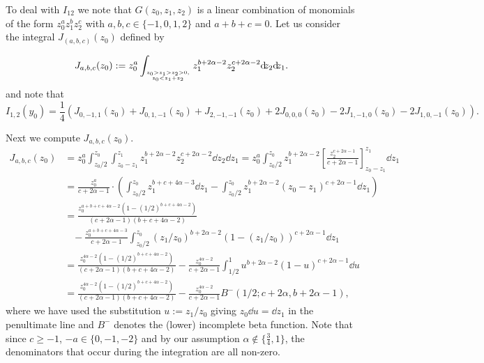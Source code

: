 To deal with $I_{12}$ we note that $G(z_0,z_1,z_2)$ is a linear combination of monomials of the form $z_0^az_1^bz_2^c$ with 
$a,b,c \in \{-1,0,1,2\}$ and $a+b+c=0$. Let us consider the integral $J_{(a,b,c)}(z_0)$ defined by 

\begin{equation}\label{eq:def_Delta_P_computation_int_J_1}
	J_{a,b,c}(z_0) := z_0^a \int_{{z_0>z_1>z_2>0,}\atop{z_0 < z_1+z_2}} z_1^{b+2\alpha-2} z_2^{c+2\alpha-2} {\operatorname{\mathrm{d}\hspace{-2pt}}}z_2{\operatorname{\mathrm{d}\hspace{-2pt}}}z_1.
\end{equation}
and note that
\begin{equation}\label{eq:Delta_P_computation_I12_with_J}
	I_{1,2}(y_0) = \frac{1}{4} (J_{0,-1,1}(z_0)+J_{0,1,-1}(z_0)+J_{2,-1,-1}(z_0)+2J_{0,0,0}(z_0)-2J_{1,-1,0}(z_0)-2J_{1,0,-1}(z_0)).
\end{equation}

Next we compute $J_{a,b,c}(z_0)$.
\begin{align*}
	J_{a,b,c}(z_0) 
	&= z_0^a \int_{z_0/2}^{z_0}\int_{z_0-z_1}^{z_1} z_1^{b+2\alpha-2} z_2^{c+2\alpha-2} {\dd}z_2{\dd}z_1
		= z_0^a \int_{z_0/2}^{z_0} z_1^{b+2\alpha-2} \left[ \frac{ z_2^{c+2\alpha-1} }{ c+2\alpha-1 } \right]_{z_0-z_1}^{z_1} \dd z_1\\
	&= \frac{z_0^a}{c+2\alpha-1} \cdot \left( \int_{z_0/2}^{z_0} z_1^{b+c+4\alpha-3} \dd z_1
	   - \int_{z_0/2}^{z_0} z_1^{b+2\alpha-2} (z_0-z_1)^{c+2\alpha-1} {\dd}z_1 \right) \\
	&= \frac{z_0^{a+b+c+4\alpha-2}(1-(1/2)^{b+c+4\alpha-2})}{(c+2\alpha-1)(b+c+4\alpha-2)} \\
	&\hspace{10pt}- \frac{z_0^{a+b+c+4\alpha-3}}{c+2\alpha-1} \int_{z_0/2}^{z_0}  \left(z_1/z_0\right)^{b+2\alpha-2} 
	    \left(1-(z_1/z_0)\right)^{c+2\alpha-1} \dd z_1\\
	&= \frac{z_0^{4\alpha-2}(1-(1/2)^{b+c+4\alpha-2})}{(c+2\alpha-1)(b+c+4\alpha-2)} 
		- \frac{z_0^{4\alpha-2}}{c+2\alpha-1}
	   \int_{1/2}^1  u^{b+2\alpha-2}(1-u)^{c+2\alpha-1} \dd u \\
	&= \frac{z_0^{4\alpha-2}(1-(1/2)^{b+c+4\alpha-2})}{(c+2\alpha-1)(b+c+4\alpha-2)} 
		- \frac{z_0^{4\alpha-2}}{c+2\alpha-1} B^-(1/2;c+2\alpha, b+2\alpha-1),
\end{align*}
where we have used the substitution $u := z_1/z_0$ giving $z_0 {\dd} u = {\dd} z_1$ in the penultimate line and
$B^-$ denotes the (lower) incomplete beta function. Note that since $c \geq -1$, $-a \in \{0,-1,-2\}$ and by our assumption $\alpha \not \in \{\frac{3}{4},1\}$, the denominators that occur during the integration are all non-zero.

